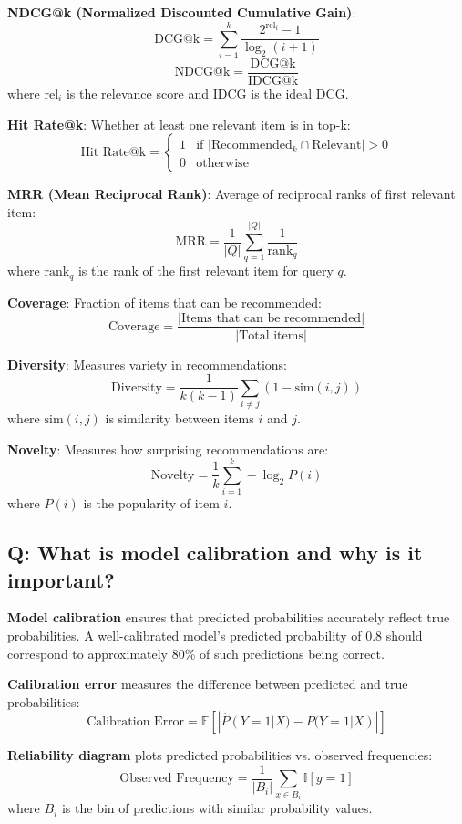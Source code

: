 \textbf{NDCG@k (Normalized Discounted Cumulative Gain)}:
\[
\text{DCG@k} = \sum_{i=1}^{k} \frac{2^{\text{rel}_i} - 1}{\log_2(i + 1)}
\]
\[
\text{NDCG@k} = \frac{\text{DCG@k}}{\text{IDCG@k}}
\]
where \(\text{rel}_i\) is the relevance score and IDCG is the ideal DCG.

\textbf{Hit Rate@k}: Whether at least one relevant item is in top-k:
\[
\text{Hit Rate@k} = \begin{cases}
1 & \text{if } |\text{Recommended}_k \cap \text{Relevant}| > 0 \\
0 & \text{otherwise}
\end{cases}
\]

\textbf{MRR (Mean Reciprocal Rank)}: Average of reciprocal ranks of first relevant item:
\[
\text{MRR} = \frac{1}{|Q|} \sum_{q=1}^{|Q|} \frac{1}{\text{rank}_q}
\]
where \(\text{rank}_q\) is the rank of the first relevant item for query \(q\).

\textbf{Coverage}: Fraction of items that can be recommended:
\[
\text{Coverage} = \frac{|\text{Items that can be recommended}|}{|\text{Total items}|}
\]

\textbf{Diversity}: Measures variety in recommendations:
\[
\text{Diversity} = \frac{1}{k(k-1)} \sum_{i \neq j} (1 - \text{sim}(i, j))
\]
where \(\text{sim}(i, j)\) is similarity between items \(i\) and \(j\).

\textbf{Novelty}: Measures how surprising recommendations are:
\[
\text{Novelty} = \frac{1}{k} \sum_{i=1}^{k} -\log_2 P(i)
\]
where \(P(i)\) is the popularity of item \(i\).

\subsection*{Q: What is model calibration and why is it important?}
\textbf{Model calibration} ensures that predicted probabilities accurately reflect true probabilities. A well-calibrated model's predicted probability of 0.8 should correspond to approximately 80\% of such predictions being correct.

\textbf{Calibration error} measures the difference between predicted and true probabilities:
\[
\text{Calibration Error} = \mathbb{E}[|\hat{P}(Y=1|X) - P(Y=1|X)|]
\]

\textbf{Reliability diagram} plots predicted probabilities vs. observed frequencies:
\[
\text{Observed Frequency} = \frac{1}{|B_i|} \sum_{x \in B_i} \mathbb{I}[y = 1]
\]
where \(B_i\) is the bin of predictions with similar probability values.

